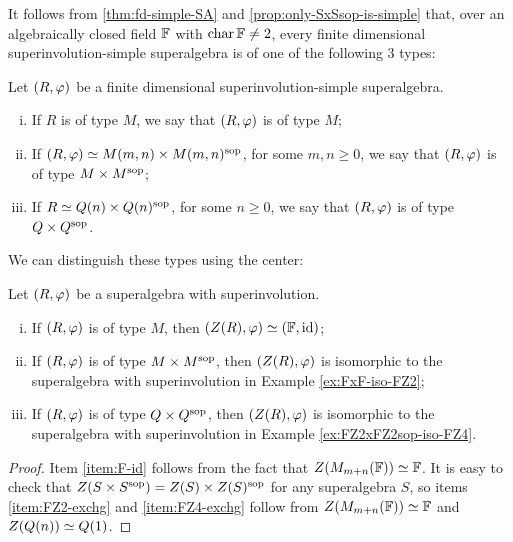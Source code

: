 It follows from \cref{thm:fd-simple-SA} and \cref{prop:only-SxSsop-is-simple} that, over an algebraically closed field $\mathbb{F}$ with $\operatorname{char} \mathbb{F} \neq 2$, every finite dimensional superinvolution-simple superalgebra is of one of the following 3 types:

\begin{defi}\label{defi:types-sinv-simple}
    Let $(R, \varphi)$ be a finite dimensional superinvolution-simple superalgebra. 
    \begin{enumerate}[(i)]
        \item If $R$ is of type $M$, we say that $(R, \varphi)$ is of type $M$;
        \item If $(R, \varphi) \simeq M(m,n) \times M(m,n)^{\mathrm{sop}}$, for some $m,n \geq 0$, we say that $(R, \varphi)$ is of type $M\times M^{\mathrm{sop}}$;
        \item If $R \simeq Q(n) \times Q(n)^{\mathrm{sop}}$, for some $n \geq 0$, we say that $(R, \varphi)$ is of type $Q \times Q^{\mathrm{sop}}$.
    \end{enumerate}
\end{defi}

We can distinguish these types using the center:

\begin{prop}\label{prop:types-of-SA-via-center}
	Let $(R, \varphi)$ be a superalgebra with superinvolution.
	\begin{enumerate}[(i)]
		\item If $(R, \varphi)$ is of type $M$, then $(Z(R), \varphi) \simeq (\mathbb{F}, \operatorname{id})$;\label{item:F-id}
		\item If $(R, \varphi)$ is of type $M\times M^{\mathrm{sop}}$, then $(Z(R), \varphi)$ is isomorphic to the superalgebra with superinvolution in Example \ref{ex:FxF-iso-FZ2};\label{item:FZ2-exchg}
		\item If $(R, \varphi)$ is of type $Q\times Q^{\mathrm{sop}}$, then $(Z(R), \varphi)$ is isomorphic to the superalgebra with superinvolution in Example \ref{ex:FZ2xFZ2sop-iso-FZ4}.\label{item:FZ4-exchg}
	\end{enumerate}
\end{prop}

\begin{proof}
	Item \eqref{item:F-id} follows from the fact that $Z(M_{m+n}(\mathbb{F})) \simeq \mathbb{F}$.
	It is easy to check that $Z(S\times S^{\mathrm{sop}}) = Z(S) \times Z(S)^{\mathrm{sop}}$ for any superalgebra $S$, so items \eqref{item:FZ2-exchg} and \eqref{item:FZ4-exchg} follow from $Z(M_{m+n}(\mathbb{F})) \simeq \mathbb{F}$ and $Z(Q(n)) \simeq Q(1)$.
\end{proof}

